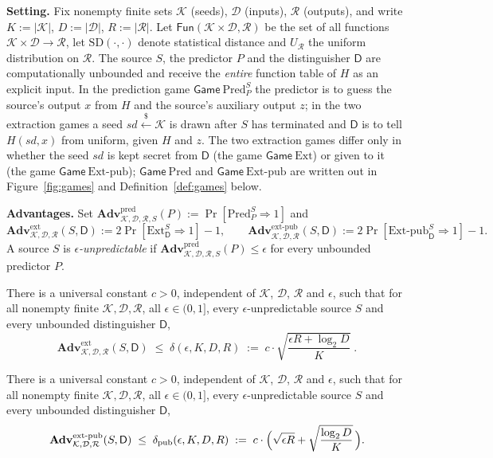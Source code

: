 \documentclass{aicr-solution}
\newcommand{\Fun}{\mathsf{Fun}}
\newcommand{\Adv}{\mathbf{Adv}}
\newcommand{\Gm}{\mathsf{Game}}
\newcommand{\Pred}{\mathrm{Pred}}
\newcommand{\Ext}{\mathrm{Ext}}
\newcommand{\Extp}{\mathrm{Ext}\text{-}\mathrm{pub}}
\newcommand{\pred}{\mathrm{pred}}
\newcommand{\ext}{\mathrm{ext}}
\newcommand{\extp}{\mathrm{ext}\text{-}\mathrm{pub}}
\newcommand{\sd}{\mathit{sd}}
\renewcommand{\sample}{\stackrel{{\scriptscriptstyle\$}}{\leftarrow}}
\newcommand{\SD}{\mathrm{SD}}
\newcommand{\calK}{\mathcal{K}}
\newcommand{\calD}{\mathcal{D}}
\newcommand{\calR}{\mathcal{R}}
\begin{document}
\medskip
\noindent\textbf{Setting.}
Fix nonempty finite sets $\calK$ (seeds), $\calD$ (inputs), $\calR$ (outputs), and write
$K := |\calK|$, $D := |\calD|$, $R := |\calR|$. Let $\Fun(\calK \times \calD, \calR)$ be the set of
all functions $\calK \times \calD \to \calR$, let $\SD(\cdot,\cdot)$ denote statistical distance and
$U_{\calR}$ the uniform distribution on $\calR$. The source $S$, the predictor $P$ and the
distinguisher $\mathsf{D}$ are computationally unbounded and receive the \emph{entire} function
table of $H$ as an explicit input. In the prediction game $\Gm\ \Pred^{S}_{P}$ the predictor is
to guess the source's output $x$ from $H$ and the source's auxiliary output $z$; in the two
extraction games a seed $\sd \sample \calK$ is drawn after $S$ has terminated and $\mathsf{D}$ is
to tell $H(\sd,x)$ from uniform, given $H$ and $z$. The two extraction games differ only in
whether the seed $\sd$ is kept secret from $\mathsf{D}$ (the game $\Gm\ \Ext$) or given to it
(the game $\Gm\ \Extp$); $\Gm\ \Pred$ and $\Gm\ \Extp$ are written out in
Figure~\ref{fig:games} and Definition~\ref{def:games} below.

\medskip
\noindent\textbf{Advantages.}
Set $\Adv^{\pred}_{\calK,\calD,\calR,S}(P) := \Pr[\Pred^{S}_{P} \Rightarrow 1]$ and
\[
  \Adv^{\ext}_{\calK,\calD,\calR}(S,\mathsf{D}) := 2\Pr[\Ext^{S}_{\mathsf{D}} \Rightarrow 1] - 1 ,
  \qquad
  \Adv^{\extp}_{\calK,\calD,\calR}(S,\mathsf{D}) := 2\Pr[\Extp^{S}_{\mathsf{D}} \Rightarrow 1] - 1 .
\]
A source $S$ is \emph{$\epsilon$-unpredictable} if
$\Adv^{\pred}_{\calK,\calD,\calR,S}(P) \le \epsilon$ for every unbounded predictor $P$.

\begin{conjecture}\label{conj:stmt-secret}
There is a universal constant $c > 0$, independent of $\calK$, $\calD$, $\calR$ and $\epsilon$, such
that for all nonempty finite $\calK, \calD, \calR$, all $\epsilon \in (0,1]$, every
$\epsilon$-unpredictable source $S$ and every unbounded distinguisher $\mathsf{D}$,
\[
  \Adv^{\ext}_{\calK,\calD,\calR}(S,\mathsf{D})
  \;\le\; \delta(\epsilon, K, D, R)
  \;:=\; c \cdot \sqrt{\frac{\epsilon R + \log_2 D}{K}} \; .
\]
\end{conjecture}

\begin{conjecture}\label{conj:stmt-pub}
There is a universal constant $c > 0$, independent of $\calK$, $\calD$, $\calR$ and $\epsilon$, such
that for all nonempty finite $\calK, \calD, \calR$, all $\epsilon \in (0,1]$, every
$\epsilon$-unpredictable source $S$ and every unbounded distinguisher $\mathsf{D}$,
\[
  \Adv^{\extp}_{\calK,\calD,\calR}(S,\mathsf{D})
  \;\le\; \delta_{\mathrm{pub}}(\epsilon, K, D, R)
  \;:=\; c \cdot \Bigl( \sqrt{\epsilon R} + \sqrt{\frac{\log_2 D}{K}} \,\Bigr) .
\]
\end{conjecture}
\end{document}
